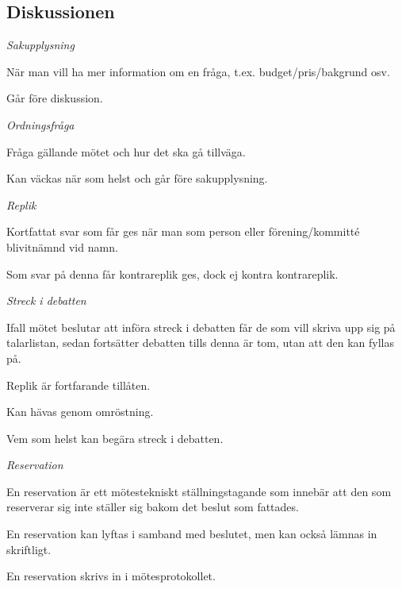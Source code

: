 \documentclass[11pt, noincludeaddress]{classes/cthit}
\let\tempone\itemize
\let\temptwo\enditemize
\renewenvironment{itemize}{\tempone\addtolength{\itemsep}{-0.3\baselineskip}}{\temptwo}
\begin{document}
\subsection{Diskussionen}
\begin{itemize}
    \item \textit{Sakupplysning}
    \begin{itemize}
        \item När man vill ha mer information om en fråga, t.ex. budget/pris/bakgrund osv.
        \item Går före diskussion.
    \end{itemize}
    \item \textit{Ordningsfråga}
    \begin{itemize}
        \item Fråga gällande mötet och hur det ska gå tillväga.
        \item Kan väckas när som helst och går före sakupplysning.
    \end{itemize}
    \item \textit{Replik}
    \begin{itemize}
        \item Kortfattat svar som får ges när man som person eller förening/kommitté blivitnämnd vid namn.
        \item Som svar på denna får kontrareplik ges, dock ej kontra kontrareplik.
    \end{itemize}
    \item \textit{Streck i debatten}
    \begin{itemize}
        \item Ifall mötet beslutar att införa streck i debatten får de som vill skriva upp sig på talarlistan, sedan fortsätter debatten tills denna är tom, utan att den kan fyllas på.
        \item Replik är fortfarande tillåten.
        \item Kan hävas genom omröstning.
        \item Vem som helst kan begära streck i debatten.
    \end{itemize}
    \item \textit{Reservation}
    \begin{itemize}
        \item En reservation är ett mötestekniskt ställningstagande som innebär att den som reserverar sig inte ställer sig bakom det beslut som fattades.
        \item En reservation kan lyftas i samband med beslutet, men kan också lämnas in skriftligt.
        \item En reservation skrivs in i mötesprotokollet.
    \end{itemize}
\end{itemize}
\end{document}
